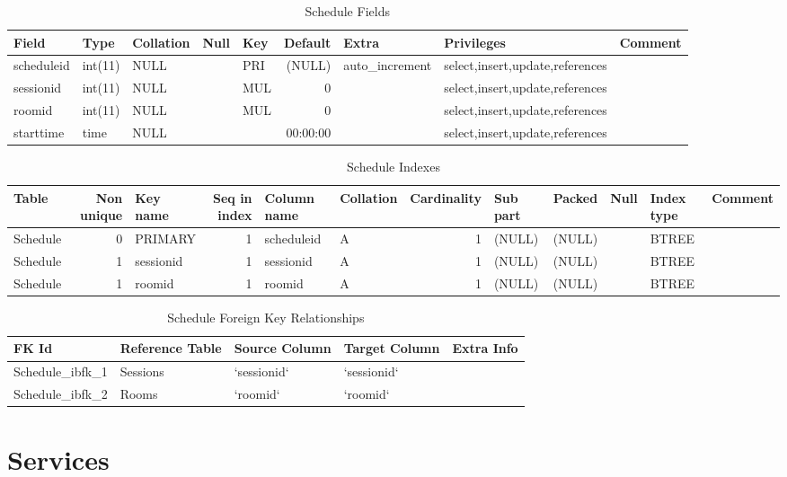 \documentclass[captions=tablesignature]{scrartcl}
\begin{document}
\begin{table}[htb]
\caption{\label{tbl:schedulefields}Schedule Fields}
\centering
\begin{tabular}{lllllrlll}
\hline
Field & Type & Collation & Null & Key & Default & Extra & Privileges & Comment\\
\hline
scheduleid & int(11) & NULL &  & PRI & (NULL) & auto\_increment & select,insert,update,references & \\
sessionid & int(11) & NULL &  & MUL & 0 &  & select,insert,update,references & \\
roomid & int(11) & NULL &  & MUL & 0 &  & select,insert,update,references & \\
starttime & time & NULL &  &  & 00:00:00 &  & select,insert,update,references & \\
\hline
\end{tabular}
\end{table}

\begin{table}[htb]
\caption{\label{tbl:scheduleindexes}Schedule Indexes}
\centering
\begin{tabular}{lrlrllrlllll}
\hline
Table & Non unique & Key name & Seq in index & Column name & Collation & Cardinality & Sub part & Packed & Null & Index type & Comment\\
\hline
Schedule & 0 & PRIMARY & 1 & scheduleid & A & 1 & (NULL) & (NULL) &  & BTREE & \\
Schedule & 1 & sessionid & 1 & sessionid & A & 1 & (NULL) & (NULL) &  & BTREE & \\
Schedule & 1 & roomid & 1 & roomid & A & 1 & (NULL) & (NULL) &  & BTREE & \\
\hline
\end{tabular}
\end{table}

\begin{table}[htb]
\caption{\label{tbl:schedulefkr}Schedule Foreign Key Relationships}
\centering
\begin{tabular}{lllll}
\hline
FK Id & Reference Table & Source Column & Target Column & Extra Info\\
\hline
Schedule\_ibfk\_1 & Sessions & `sessionid` & `sessionid` & \\
Schedule\_ibfk\_2 & Rooms & `roomid` & `roomid` & \\
\hline
\end{tabular}
\end{table}
\section{Services}
\label{sec-25}
\end{document}
